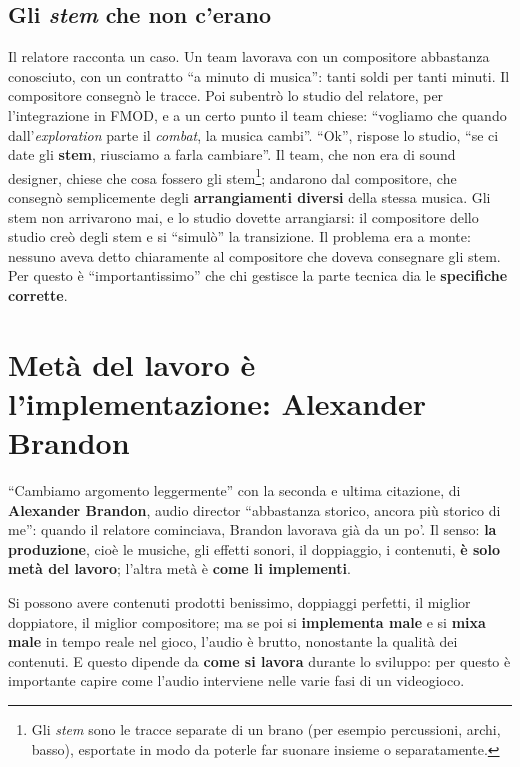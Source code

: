 \subsection{Gli \emph{stem} che non c'erano}

Il relatore racconta un caso. Un team lavorava con un compositore abbastanza
conosciuto, con un contratto ``a minuto di musica'': tanti soldi per tanti
minuti. Il compositore consegnò le tracce. Poi subentrò lo studio del relatore,
per l'integrazione in FMOD, e a un certo punto il team chiese: ``vogliamo che
quando dall'\emph{exploration} parte il \emph{combat}, la musica cambi''.
``Ok'', rispose lo studio, ``se ci date gli \textbf{stem}, riusciamo a farla
cambiare''. Il team, che non era di sound designer, chiese che cosa fossero gli
stem\footnote{Gli \emph{stem} sono le tracce separate di un brano (per esempio
percussioni, archi, basso), esportate in modo da poterle far suonare insieme o
separatamente.}; andarono dal compositore, che consegnò semplicemente degli
\textbf{arrangiamenti diversi} della stessa musica. Gli stem non arrivarono mai, e
lo studio dovette arrangiarsi: il compositore dello studio creò degli stem e si
``simulò'' la transizione. Il problema era a monte: nessuno aveva detto chiaramente
al compositore che doveva consegnare gli stem. Per questo è ``importantissimo''
che chi gestisce la parte tecnica dia le \textbf{specifiche corrette}.

\section[Metà del lavoro è l'implementazione]{Metà del lavoro è l'implementazione: Alexander Brandon}
\label{z9:sec:brandon}

``Cambiamo argomento leggermente'' con la seconda e ultima citazione, di
\textbf{Alexander Brandon}, audio director ``abbastanza storico, ancora più
storico di me'': quando il relatore cominciava, Brandon lavorava già da un po'.
Il senso: \textbf{la produzione}, cioè le musiche, gli effetti sonori, il
doppiaggio, i contenuti, \textbf{è solo metà del lavoro}; l'altra metà è
\textbf{come li implementi}.

Si possono avere contenuti prodotti benissimo, doppiaggi perfetti, il miglior
doppiatore, il miglior compositore; ma se poi si \textbf{implementa male} e si
\textbf{mixa male} in tempo reale nel gioco, l'audio è brutto, nonostante la
qualità dei contenuti. E questo dipende da \textbf{come si lavora} durante lo
sviluppo: per questo è importante capire come l'audio interviene nelle varie
fasi di un videogioco.

